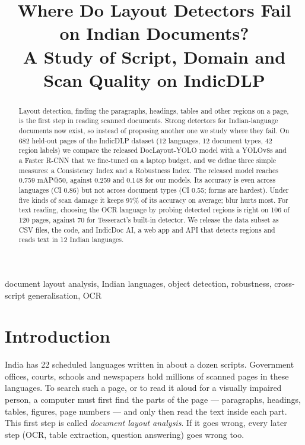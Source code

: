 \documentclass[conference]{IEEEtran}
\begin{document}
\title{Where Do Layout Detectors Fail on Indian Documents?\\ A Study of Script, Domain and Scan Quality on IndicDLP}

\author{
}

\maketitle

\begin{abstract}
Layout detection, finding the paragraphs, headings, tables and other regions on a page, is the first step in reading scanned documents. Strong detectors for Indian-language documents now exist, so instead of proposing another one we study where they fail. On 682 held-out pages of the IndicDLP dataset (12 languages, 12 document types, 42 region labels) we compare the released DocLayout-YOLO model with a YOLOv8s and a Faster R-CNN that we fine-tuned on a laptop budget, and we define three simple measures: a Consistency Index and a Robustness Index. The released model reaches 0.759 mAP@50, against 0.259 and 0.148 for our models. Its accuracy is even across languages (CI 0.86) but not across document types (CI 0.55; forms are hardest). Under five kinds of scan damage it keeps 97\% of its accuracy on average; blur hurts most. For text reading, choosing the OCR language by probing detected regions is right on 106 of 120 pages, against 70 for Tesseract's built-in detector. We release the data subset as CSV files, the code, and IndicDoc AI, a web app and API that detects regions and reads text in 12 Indian languages.
\end{abstract}

\begin{IEEEkeywords}
document layout analysis, Indian languages, object detection, robustness, cross-script generalisation, OCR
\end{IEEEkeywords}

\section{Introduction}
India has 22 scheduled languages written in about a dozen scripts. Government offices, courts, schools and
newspapers hold millions of scanned pages in these languages. To search such a page, or to read it aloud for a
visually impaired person, a computer must first find the parts of the page --- paragraphs, headings, tables,
figures, page numbers --- and only then read the text inside each part. This first step is called
\emph{document layout analysis}. If it goes wrong, every later step (OCR, table extraction, question answering)
goes wrong too.
\end{document}
